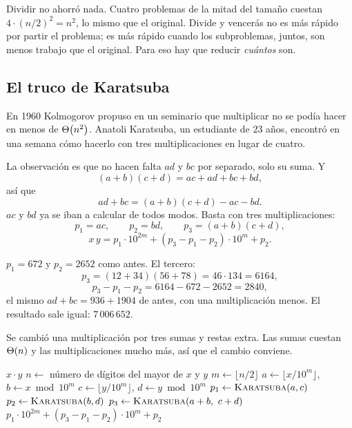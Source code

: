 \documentclass[11pt,letterpaper]{article}
\begin{document}
\begin{ojo}
  Dividir no ahorró nada. Cuatro problemas de la mitad del tamaño
  cuestan $4 \cdot (n/2)^2 = n^2$, lo mismo que el original. Divide y
  vencerás no es más rápido por partir el problema; es más rápido
  cuando los subproblemas, juntos, son menos trabajo que el original.
  Para eso hay que reducir \emph{cuántos} son.
\end{ojo}


\subsection*{El truco de Karatsuba}

En 1960 Kolmogorov propuso en un seminario que multiplicar no se podía
hacer en menos de $\Theta\!\left(n^2\right)$. Anatoli Karatsuba, un estudiante de
$23$ años, encontró en una semana cómo hacerlo con tres
multiplicaciones en lugar de cuatro.

La observación es que no hacen falta $ad$ y $bc$ por separado, solo su
suma. Y
\[
  (a + b)(c + d) = ac + ad + bc + bd ,
\]
así que
\[
  ad + bc = (a + b)(c + d) - ac - bd .
\]
$ac$ y $bd$ ya se iban a calcular de todos modos. Basta con tres
multiplicaciones:
\[
  p_1 = ac , \qquad p_2 = bd , \qquad p_3 = (a + b)(c + d) ,
\]
\[
  x\,y = p_1 \cdot 10^{2m} + (p_3 - p_1 - p_2) \cdot 10^{m} + p_2 .
\]

\begin{ejemplo}
  $p_1 = 672$ y $p_2 = 2652$ como antes. El tercero:
  \[
    p_3 = (12 + 34)(56 + 78) = 46 \cdot 134 = 6164 ,
  \]
  \[
    p_3 - p_1 - p_2 = 6164 - 672 - 2652 = 2840 ,
  \]
  el mismo $ad + bc = 936 + 1904$ de antes, con una multiplicación
  menos. El resultado sale igual: $7\,006\,652$.
\end{ejemplo}

Se cambió una multiplicación por tres sumas y restas extra. Las sumas
cuestan $\Theta\!\left(n\right)$ y las multiplicaciones mucho más, así que el cambio
conviene.

\begin{algorithm}[H]
\caption{\textsc{Karatsuba}$(x, y)$}
\begin{algorithmic}[1]
  \State \Return $x \cdot y$ 
\EndIf
\State $n \gets$ número de dígitos del mayor de $x$ y $y$
\State $m \gets \lfloor n / 2 \rfloor$
\State $a \gets \lfloor x / 10^{m} \rfloor$, \quad $b \gets x \bmod 10^{m}$
\State $c \gets \lfloor y / 10^{m} \rfloor$, \quad $d \gets y \bmod 10^{m}$
\State $p_1 \gets \textsc{Karatsuba}(a, c)$
\State $p_2 \gets \textsc{Karatsuba}(b, d)$
\State $p_3 \gets \textsc{Karatsuba}(a + b,\ c + d)$
\State \Return $p_1 \cdot 10^{2m} + (p_3 - p_1 - p_2) \cdot 10^{m} + p_2$
\end{algorithmic}
\end{algorithm}
\end{document}

